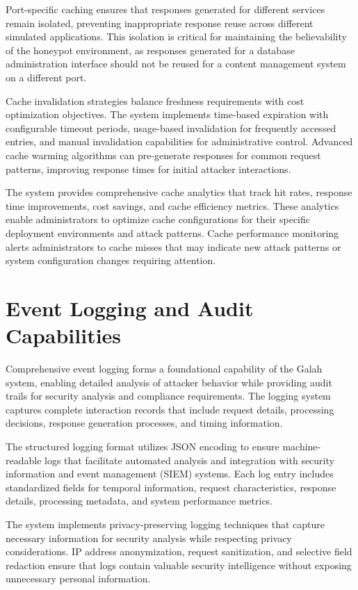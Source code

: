 Port-specific caching ensures that responses generated for different services remain isolated, preventing inappropriate response reuse across different simulated applications. This isolation is critical for maintaining the believability of the honeypot environment, as responses generated for a database administration interface should not be reused for a content management system on a different port.

Cache invalidation strategies balance freshness requirements with cost optimization objectives. The system implements time-based expiration with configurable timeout periods, usage-based invalidation for frequently accessed entries, and manual invalidation capabilities for administrative control. Advanced cache warming algorithms can pre-generate responses for common request patterns, improving response times for initial attacker interactions.

The system provides comprehensive cache analytics that track hit rates, response time improvements, cost savings, and cache efficiency metrics. These analytics enable administrators to optimize cache configurations for their specific deployment environments and attack patterns. Cache performance monitoring alerts administrators to cache misses that may indicate new attack patterns or system configuration changes requiring attention.

\section{Event Logging and Audit Capabilities}

Comprehensive event logging forms a foundational capability of the Galah system, enabling detailed analysis of attacker behavior while providing audit trails for security analysis and compliance requirements. The logging system captures complete interaction records that include request details, processing decisions, response generation processes, and timing information.

The structured logging format utilizes JSON encoding to ensure machine-readable logs that facilitate automated analysis and integration with security information and event management (SIEM) systems. Each log entry includes standardized fields for temporal information, request characteristics, response details, processing metadata, and system performance metrics.

The system implements privacy-preserving logging techniques that capture necessary information for security analysis while respecting privacy considerations. IP address anonymization, request sanitization, and selective field redaction ensure that logs contain valuable security intelligence without exposing unnecessary personal information.

